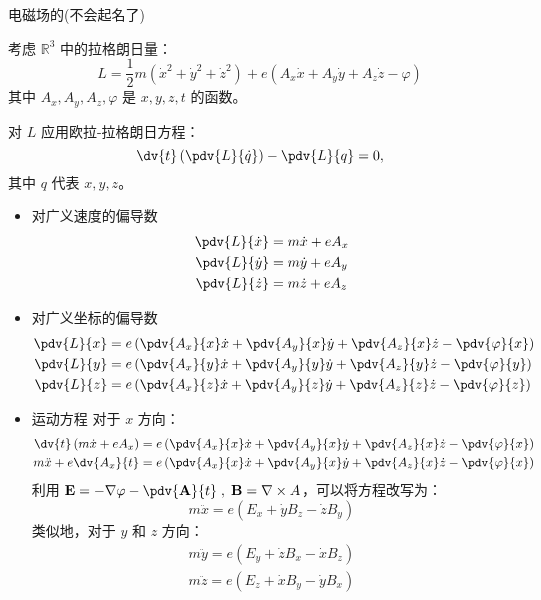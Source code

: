 \documentclass[12pt, a4paper, oneside, UTF8]{ctexbook}  %
\begin{document}
\begin{example}
电磁场的(不会起名了)
    
    考虑 \(\mathbb{R}^3\) 中的拉格朗日量：
    \[
    L = \frac{1}{2} m (\dot{x}^2 + \dot{y}^2 + \dot{z}^2) + e (A_x \dot{x} + A_y \dot{y} + A_z \dot{z} - \varphi)
    \]
    其中 \( A_x, A_y, A_z, \varphi \) 是 \( x, y, z, t \) 的函数。
    \begin{solution}
对 \( L \) 应用欧拉-拉格朗日方程：
\[
\dv{t} \left( \pdv{L}{\dot{q}} \right) - \pdv{L}{q} = 0,
\]
其中 \( q \) 代表 \( x, y, z \)。
\begin{itemize}
    \item 对广义速度的偏导数
\begin{align*}
\pdv{L}{\dot{x}} &= m \dot{x} + e A_x \\
\pdv{L}{\dot{y}} &= m \dot{y} + e A_y \\
\pdv{L}{\dot{z}} &= m \dot{z} + e A_z
\end{align*}
\item 对广义坐标的偏导数
\begin{align*}
\pdv{L}{x} &= e \left( \pdv{A_x}{x} \dot{x} + \pdv{A_y}{x} \dot{y} + \pdv{A_z}{x} \dot{z} - \pdv{\varphi}{x} \right) \\
\pdv{L}{y} &= e \left( \pdv{A_x}{y} \dot{x} + \pdv{A_y}{y} \dot{y} + \pdv{A_z}{y} \dot{z} - \pdv{\varphi}{y} \right) \\
\pdv{L}{z} &= e \left( \pdv{A_x}{z} \dot{x} + \pdv{A_y}{z} \dot{y} + \pdv{A_z}{z} \dot{z} - \pdv{\varphi}{z} \right)
\end{align*}
\item 运动方程
对于 \( x \) 方向：
\begin{align*}
\dv{t} \left( m \dot{x} + e A_x \right) &= e \left( \pdv{A_x}{x} \dot{x} + \pdv{A_y}{x} \dot{y} + \pdv{A_z}{x} \dot{z} - \pdv{\varphi}{x} \right) \\
m \ddot{x} + e \dv{A_x}{t} &= e \left( \pdv{A_x}{x} \dot{x} + \pdv{A_y}{x} \dot{y} + \pdv{A_z}{x} \dot{z} - \pdv{\varphi}{x} \right)
\end{align*}
利用 \(\displaystyle \mathbf{E} = -\nabla \varphi - \pdv{\mathbf{A}}{t}
\;,\; \mathbf{B}=\nabla\times A \)，可以将方程改写为：
\[
m \ddot{x} = e \left( E_x + \dot{y} B_z - \dot{z} B_y \right)
\]
类似地，对于 \( y \) 和 \( z \) 方向：
\begin{gather*}
    m \ddot{y} = e \left( E_y + \dot{z} B_x - \dot{x} B_z \right)
    \\
    m \ddot{z} = e \left( E_z + \dot{x} B_y - \dot{y} B_x \right)
\end{gather*}
\end{itemize}
    \end{solution} 
\end{example}
\end{document}
